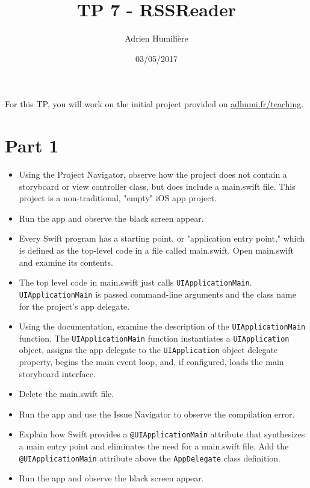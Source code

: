\documentclass[a4paper,11pt]{scrartcl}
\begin{document}
\newcommand{\mytitle}{TP 7 - RSSReader}
\title{\mytitle}
\author{Adrien Humilière}
\date{03/05/2017}

\maketitle

For this TP, you will work on the initial project provided on \underline{adhumi.fr/teaching}.

\section*{Part 1}

\begin{itemize}
\item Using the Project Navigator, observe how the project does not contain a storyboard or view controller class, but does include a main.swift file. This project is a non-traditional, "empty" iOS app project.
\item Run the app and observe the black screen appear.
\item Every Swift program has a starting point, or "application entry point," which is defined as the top-level code in a file called main.swift. Open main.swift and examine its contents.
\item The top level code in main.swift just calls \texttt{UIApplicationMain}. \texttt{UIApplicationMain} is passed command-line arguments and the class name for the project's app delegate.
\item Using the documentation, examine the description of the \texttt{UIApplicationMain} function. The \texttt{UIApplicationMain} function instantiates a \texttt{UIApplication} object, assigns the app delegate to the \texttt{UIApplication} object delegate property, begins the main event loop, and, if configured, loads the main storyboard interface.
\item Delete the main.swift file.
\item Run the app and use the Issue Navigator to observe the compilation error.
\item Explain how Swift provides a \texttt{@UIApplicationMain} attribute that synthesizes a main entry point and eliminates the need for a main.swift file. Add the \texttt{@UIApplicationMain} attribute above the \texttt{AppDelegate} class definition.
\item Run the app and observe the black screen appear.
\end{itemize}
\end{document}
